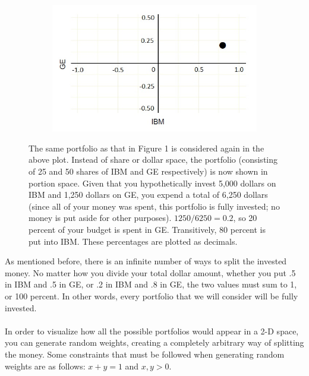 \documentclass{article}\usepackage{graphicx, color}
\begin{document}
\begin{figure}[H]
  \begin{subfigure}[b]{1.0\textwidth}
    \centering
    \includegraphics[width=\textwidth]{portionspace}
    \label{fig:portionspace}
  \end{subfigure}
\caption{The same portfolio as that in Figure 1 is considered again in the above plot. Instead of share or dollar space, the portfolio (consisting of 25 and 50 shares of IBM and GE respectively) is now shown in portion space. Given that you hypothetically invest 5,000 dollars on IBM and 1,250 dollars on GE, you expend a total of 6,250 dollars (since all of your money was spent, this portfolio is fully invested; no money is put aside for other purposes). $1250/6250 = 0.2$, so 20 percent of your budget is spent in GE. Transitively, 80 percent is put into IBM. These percentages are plotted as decimals.}
\end{figure}

As mentioned before, there is an infinite number of ways to split the invested money. No matter how you divide your total dollar amount, whether you put .5 in IBM and .5 in GE, or .2 in IBM and .8 in GE, the two values must sum to 1, or 100 percent. In other words, every portfolio that we will consider will be fully invested.
\\
\\
In order to visualize how all the possible portfolios would appear in a 2-D space, you can generate random weights, creating a completely arbitrary way of splitting the money. Some constraints that must be followed when generating random weights are as follows: $x + y = 1$ and ${x, y} > 0$.
\end{document}
